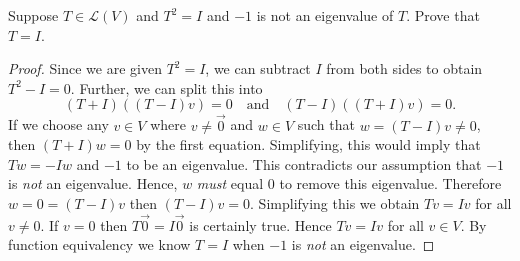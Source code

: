 Suppose $T \in \mathcal{L}(V)$ and $T^2 = I$ and $-1$ is not an eigenvalue of $T$.  Prove that $T = I$.
\begin{mybox}
    \begin{proof}
        Since we are given $T^2 = I$, we can subtract $I$ from both sides to obtain $T^2 - I = 0$. Further, we can split this into $$(T+I)((T-I)v) = 0 \quad \text{and} \quad (T-I)((T+I)v)=0.$$ If we choose any $v \in V$ where $v \neq \vec{0}$ and $w \in V$ such that $w = (T-I)v \neq 0$, then $(T+I)w = 0$ by the first equation. Simplifying, this would imply that $Tw = -Iw$ and $-1$ to be an eigenvalue. This contradicts our assumption that $-1$ is \textit{not} an eigenvalue. Hence, $w$ \textit{must} equal 0 to remove this eigenvalue. Therefore $w = 0 = (T-I)v$ then $(T-I)v = 0$. Simplifying this we obtain $Tv = Iv$ for all $v \neq 0$. If $v = 0$ then $T\vec{0} = I\vec{0}$ is certainly true. Hence $Tv = Iv$ for all $v \in V$. By function equivalency we know $T=I$ when $-1$ is \textit{not} an eigenvalue.
    \end{proof}
\end{mybox}